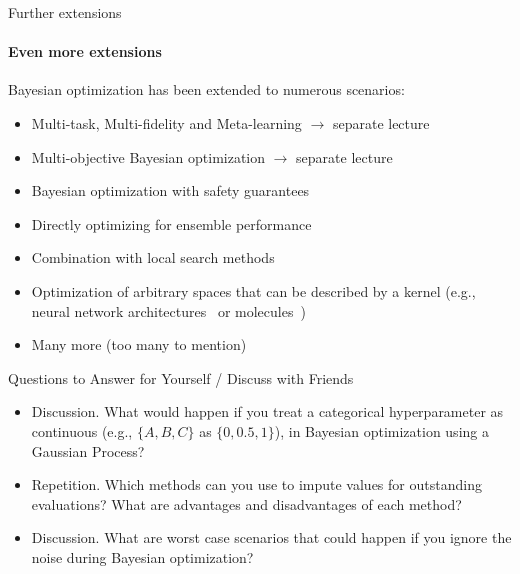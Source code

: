 \begin{frame}[c]{Further extensions}
\framesubtitle{Even more extensions}
Bayesian optimization has been extended to numerous scenarios:
\begin{itemize}
    \item Multi-task, Multi-fidelity and Meta-learning $\rightarrow$ separate lecture
    \item Multi-objective Bayesian optimization $\rightarrow$ separate lecture
    \item Bayesian optimization with safety guarantees~
    \item Directly optimizing for ensemble performance~
    \item Combination with local search methods~~
    \item Optimization of arbitrary spaces that can be described by a kernel (e.g., neural network architectures~ or 
    molecules~)
    \item Many more (too many to mention)
\end{itemize}
  
\end{frame}
\begin{frame}[c]{Questions to Answer for Yourself / Discuss with Friends}

\begin{itemize}
\item \alert{Discussion.} What would happen if you treat a categorical hyperparameter as continuous (e.g., $\{A, B, C\}$ as $\{0, 0.5, 1\}$), in Bayesian optimization using a Gaussian Process?
\medskip
\item \alert{Repetition.} Which methods can you use to impute values for outstanding evaluations? What are advantages and disadvantages of each method?
\medskip
\item \alert{Discussion.} What are worst case scenarios that could happen if you ignore the noise during Bayesian optimization?
\end{itemize}
\end{frame}